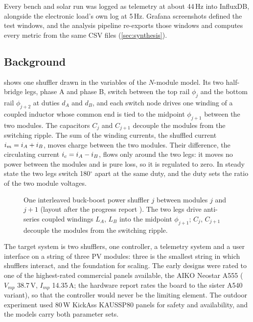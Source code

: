 Every bench and solar run was logged as telemetry at about 44\,Hz into InfluxDB, alongside the electronic load's own log at 5\,Hz. Grafana screenshots defined the test windows, and the analysis pipeline re-exports those windows and computes every metric from the same CSV files (\cref{sec:synthesis}).

\subsection{Background}
\label{sec:background}
 shows one shuffler drawn in the variables of the $N$-module model. Its two half-bridge legs, phase A and phase B, switch between the top rail $\phi_j$ and the bottom rail $\phi_{j+2}$ at duties $d_A$ and $d_B$, and each switch node drives one winding of a coupled inductor whose common end is tied to the midpoint $\phi_{j+1}$ between the two modules. The capacitors $C_j$ and $C_{j+1}$ decouple the modules from the switching ripple. The sum of the winding currents, the shuffled current $i_{m} = i_A + i_B$, moves charge between the two modules. Their difference, the circulating current $i_{c} = i_A - i_B$, flows only around the two legs: it moves no power between the modules and is pure loss, so it is regulated to zero. In steady state the two legs switch 180$^\circ$ apart at the same duty, and the duty sets the ratio of the two module voltages.

\begin{figure}[htbp]
  \centering
  
  \caption[{One interleaved buck-boost power shuffler between modules $j$ and $j+1$}]{One interleaved buck-boost power shuffler $j$ between modules $j$ and $j+1$ (layout after the progress report \cite{saunders_progress_2026}). The two legs drive anti-series coupled windings $L_A$, $L_B$ into the midpoint $\phi_{j+1}$; $C_j$, $C_{j+1}$ decouple the modules from the switching ripple.}
  \label{fig:shuffler}
\end{figure}

The target system is two shufflers, one controller, a telemetry system and a user interface on a string of three PV modules: three is the smallest string in which shufflers interact, and the foundation for scaling. The early designs were rated to one of the highest-rated commercial panels available, the AIKO Neostar A555 ($V_{mp}$ 38.7\,V, $I_{mp}$ 14.35\,A; the hardware report rates the board to the sister A540 variant), so that the controller would never be the limiting element. The outdoor experiment used 80\,W KickAss KAUSSP80 panels \cite{kaussp80_ds} for safety and availability, and the models carry both parameter sets.

